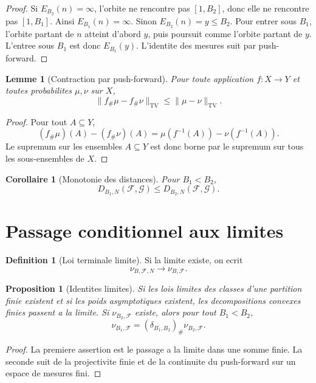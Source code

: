 \documentclass[11pt]{article}
\theoremstyle{plain}
\newtheorem{proposition}[theorem]{Proposition}
\newtheorem{lemma}[theorem]{Lemme}
\newtheorem{corollary}[theorem]{Corollaire}
\theoremstyle{definition}
\newtheorem{definition}[theorem]{Definition}
\theoremstyle{remark}
\newcommand{\TV}{\mathrm{TV}}
\newcommand{\1}{\mathbf 1}
\newcommand{\F}{\mathcal F}
\newcommand{\G}{\mathcal G}
\newcommand{\push}{_{\#}}
\begin{document}
\begin{proof}
Si \(E_{B_2}(n)=\infty\), l'orbite ne rencontre pas \([1,B_2]\), donc elle ne
rencontre pas \([1,B_1]\). Ainsi \(E_{B_1}(n)=\infty\). Sinon
\(E_{B_2}(n)=y\le B_2\). Pour entrer sous \(B_1\), l'orbite partant de \(n\)
atteint d'abord \(y\), puis poursuit comme l'orbite partant de \(y\). L'entree
sous \(B_1\) est donc \(E_{B_1}(y)\). L'identite des mesures suit par
push-forward.
\end{proof}

\begin{lemma}[Contraction par push-forward]
Pour toute application \(f:X\to Y\) et toutes probabilites \(\mu,\nu\) sur \(X\),
\[
\|f\push\mu-f\push\nu\|_{\TV}\le \|\mu-\nu\|_{\TV}.
\]
\end{lemma}

\begin{proof}
Pour tout \(A\subseteq Y\),
\[
(f\push\mu)(A)-(f\push\nu)(A)=\mu(f^{-1}(A))-\nu(f^{-1}(A)).
\]
Le supremum sur les ensembles \(A\subseteq Y\) est donc borne par le supremum
sur tous les sous-ensembles de \(X\).
\end{proof}

\begin{corollary}[Monotonie des distances]
Pour \(B_1<B_2\),
\[
D_{B_1,N}(\F,\G)\le D_{B_2,N}(\F,\G).
\]
\end{corollary}

\section{Passage conditionnel aux limites}

\begin{definition}[Loi terminale limite]
Si la limite existe, on ecrit
\[
\nu_{B,\F,N}\longrightarrow \nu_{B,\F}.
\]
\end{definition}

\begin{proposition}[Identites limites]
Si les lois limites des classes d'une partition finie existent et si les poids
asymptotiques existent, les decompositions convexes finies passent a la limite.
Si \(\nu_{B_2,\F}\) existe, alors pour tout \(B_1<B_2\),
\[
\nu_{B_1,\F}
=
(\delta_{B_1,B_2})\push\nu_{B_2,\F}.
\]
\end{proposition}

\begin{proof}
La premiere assertion est le passage a la limite dans une somme finie. La
seconde suit de la projectivite finie et de la continuite du push-forward sur
un espace de mesures fini.
\end{proof}
\end{document}
